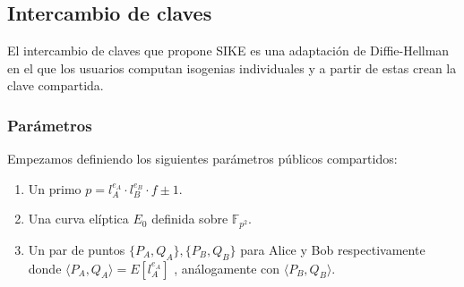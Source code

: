 %
%

\subsection{Intercambio de claves}

El intercambio de claves que propone SIKE es una adaptación de Diffie-Hellman en el que los usuarios computan isogenias individuales y a partir de estas crean la clave compartida.

\subsubsection{Parámetros}

Empezamos definiendo los siguientes parámetros públicos compartidos:

\begin{enumerate}
    \item Un primo $p=l_A^{e_A} \cdot l_B^{e_B} \cdot f \pm 1$.
    \item Una curva elíptica $E_0$ definida sobre $\mathbb{F}_{p^2}$.
    \item Un par de puntos $\{ P_A,Q_A \}, \{ P_B,Q_B \}$ para Alice y Bob respectivamente donde $\langle P_A,Q_A \rangle = E[l_A^{e_A}]$ , análogamente con $\langle P_B, Q_B \rangle$.
\end{enumerate}

